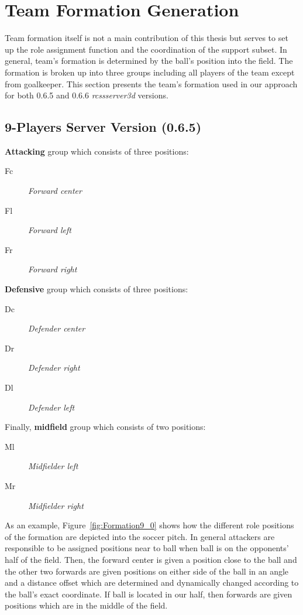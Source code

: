 \section{Team Formation Generation}
Team formation itself is not a main contribution of this thesis but serves to set up the role assignment function and the coordination of the support subset. In general, team's formation is determined by the ball's position into the field. The formation is broken up into three groups including all players of the team except from goalkeeper. This section presents the team's formation used in our approach for both 0.6.5 and 0.6.6 \textit{rcssserver3d} versions.
\subsection{9-Players Server Version (0.6.5)}
\textbf{Attacking} group which consists of three positions:
\begin{description}
\item[Fc] \textit{Forward center}
\item[Fl] \textit{Forward left}
\item[Fr] \textit{Forward right}
\end{description}
\textbf{Defensive} group which consists of three positions:
\begin{description}
\item[Dc] \textit{Defender center}
\item[Dr] \textit{Defender right }
\item[Dl] \textit{Defender left}
\end{description}
Finally, \textbf{midfield} group which consists of two positions:
\begin{description}
\item[Ml] \textit{Midfielder left}
\item[Mr] \textit{Midfielder right}
\end{description}
As an example, Figure~\ref{fig:Formation9_0} shows how the different role positions of the formation are depicted into the soccer pitch. In general attackers are responsible to be assigned positions near to ball when ball is on the opponents' half of the field. Then, the forward center  is given a position close to the ball and the other two forwards are given positions on either side of the ball in an angle and a distance offset which are determined and dynamically changed according to the ball's exact coordinate. If ball is located in our half, then forwards are given positions which are in the middle of the field. 

